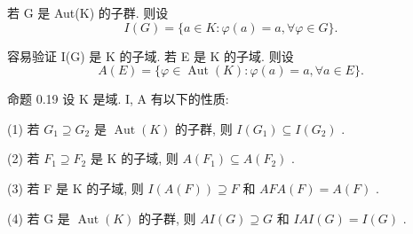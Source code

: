 \documentclass[]{article}
\begin{document}
若 G 是 Aut(K) 的子群. 则设$$
I (G) = \{a \in K: \varphi (a) = a, \forall \varphi \in G \}.
$$

容易验证 I(G) 是 K 的子域. 若 E 是 K 的子域. 则设$$
A (E) = \{\varphi \in \operatorname{Aut} (K): \varphi (a) = a, \forall a \in E \}.
$$

命题 0.19 设 K 是域. I, A 有以下的性质: 

(1) 若 $G _ { 1 } \supseteq G _ { 2 }$ 是 $\operatorname { A u t } ( K )$ 的子群, 则 $I ( G _ { 1 } ) \subseteq I ( G _ { 2 } )$ . 

(2) 若 $F _ { 1 } \supseteq F _ { 2 }$ 是 K 的子域, 则 $A ( F _ { 1 } ) \subseteq A ( F _ { 2 } )$ . 

(3) 若 F 是 K 的子域, 则 $I ( A ( F ) ) \supseteq F$ 和 $A F A ( F ) = A ( F )$ . 

(4) 若 G 是 $\operatorname { A u t } ( K )$ 的子群, 则 $A I ( G ) \supseteq G$ 和 $I A I ( G ) = I ( G )$ . 
\end{document}
